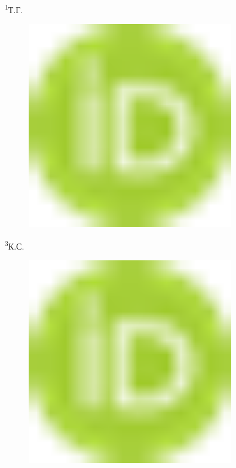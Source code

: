 {\textsuperscript{1}Т.Г.
\begin{figure}[H]
	\centering
	\includegraphics[width=0.8\textwidth]{media/gorn4/image1}
	\caption*{}
\end{figure}

\textsuperscript{3}К.С.
\begin{figure}[H]
	\centering
	\includegraphics[width=0.8\textwidth]{media/gorn4/image1}
	\caption*{}
\end{figure}


}
